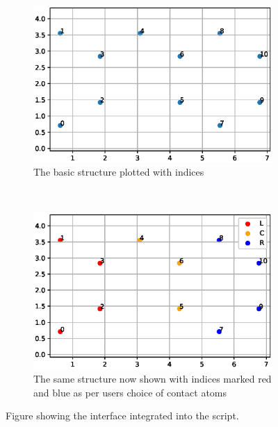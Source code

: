 \begin{figure}
\begin{subfigure}[b]{0.4\textwidth}
		\includegraphics[width=\textwidth]{Figures/basicstructure.eps}
		\caption{The basic structure plotted with indices\vspace{\baselineskip}}
		\label{basicstructure}
	\end{subfigure}\vspace{2mm}
	~ %
	\begin{subfigure}[b]{0.4\textwidth}
		\includegraphics[width=\textwidth]{Figures/basicstructurewithcontacts.eps}
		\caption{The same structure now shown with indices marked red and blue as per users choice of contact atoms}
		\label{basicstructurewithcontacts}
	\end{subfigure}
	\caption{Figure showing the interface integrated into the script.}\label{interface}
\end{figure}
